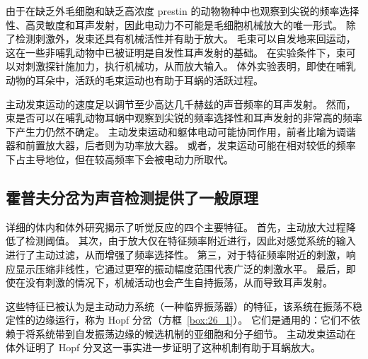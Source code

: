 由于在缺乏外毛细胞和缺乏高浓度 prestin 的动物物种中也观察到尖锐的频率选择性、高灵敏度和耳声发射，因此电动力不可能是毛细胞机械放大的唯一形式。
除了检测刺激外，发束还具有机械活性并有助于放大。
毛束可以自发地来回运动，这在一些非哺乳动物中已被证明是自发性耳声发射的基础。
在实验条件下，束可以对刺激探针施加力，执行机械功，从而放大输入。
体外实验表明，即使在哺乳动物的耳朵中，活跃的毛束运动也有助于耳蜗的活跃过程。


主动发束运动的速度足以调节至少高达几千赫兹的声音频率的耳声发射。
然而，束是否可以在哺乳动物耳蜗中观察到尖锐的频率选择性和耳声发射的非常高的频率下产生力仍然不确定。
主动发束运动和躯体电动可能协同作用，前者比喻为调谐器和前置放大器，后者则为功率放大器。
或者，发束运动可能在相对较低的频率下占主导地位，但在较高频率下会被电动力所取代。



\subsection{霍普夫分岔为声音检测提供了一般原理}

详细的体内和体外研究揭示了听觉反应的四个主要特征。
首先，主动放大过程降低了检测阈值。
其次，由于放大仅在特征频率附近进行，因此对感觉系统的输入进行了主动过滤，从而增强了频率选择性。
第三，对于特征频率附近的刺激，响应显示压缩非线性，它通过更窄的振动幅度范围代表广泛的刺激水平。
最后，即使在没有刺激的情况下，机械活动也会产生自持振荡，从而导致耳声发射。


这些特征已被认为是主动动力系统（一种临界振荡器）的特征，该系统在振荡不稳定性的边缘运行，称为 Hopf 分岔（方框~\ref{box:26_1}）。
它们是通用的：它们不依赖于将系统带到自发振荡边缘的候选机制的亚细胞和分子细节。
主动发束运动在体外证明了 Hopf 分叉这一事实进一步证明了这种机制有助于耳蜗放大。


